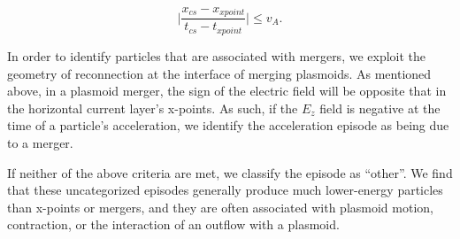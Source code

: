 \documentclass[iop,twocolappendix]{emulateapj}
\begin{document}
\begin{equation}
\lvert\frac{x_{cs} - x_{xpoint}}{t_{cs}-t_{xpoint}}\rvert \le v_{A}.
\end{equation}

In order to identify particles that are associated with mergers, we exploit the geometry of reconnection at the interface of merging plasmoids.  As mentioned above, in a plasmoid merger, the sign of the electric field will be opposite that in the horizontal current layer's x-points. As such, if the $E_{z}$ field is negative at the time of a particle's acceleration, we identify the acceleration episode as being due to a merger.

If neither of the above criteria are met, we classify the episode as ``other''.  We find that these uncategorized episodes generally produce much lower-energy particles than x-points or mergers, and they are often associated with plasmoid motion, contraction, or the interaction of an outflow with a plasmoid.  



\end{document}
